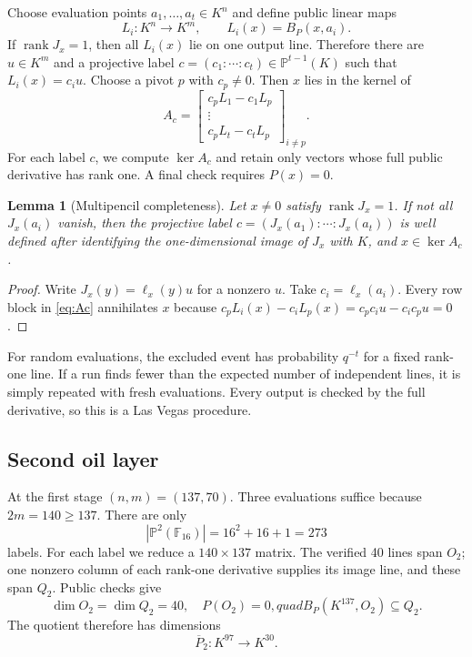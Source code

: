 \documentclass[11pt]{article}
\newtheorem{lemma}[theorem]{Lemma}
\newcommand{\F}{\mathbb{F}}
\newcommand{\Proj}{\mathbb{P}}
\newcommand{\rank}{\operatorname{rank}}
\begin{document}
Choose evaluation points $a_1,\ldots,a_t\in K^n$ and define public linear maps
\[
       L_i:K^n\longrightarrow K^m,\qquad L_i(x)=B_P(x,a_i).
\]
If $\rank J_x=1$, then all $L_i(x)$ lie on one output line.  Therefore there
are $u\in K^m$ and a projective label
$c=(c_1:\cdots:c_t)\in\Proj^{t-1}(K)$ such that $L_i(x)=c_i u$.
Choose a pivot $p$ with $c_p\neq0$.  Then $x$ lies in the kernel of
\begin{equation}
 A_c=\begin{bmatrix}
       c_pL_1-c_1L_p\\[-2pt]
       \vdots\\[-2pt]
       c_pL_t-c_tL_p
     \end{bmatrix}_{i\neq p}.                         \label{eq:Ac}
\end{equation}
For each label $c$, we compute $\ker A_c$ and retain only vectors whose full
public derivative has rank one.  A final check requires $P(x)=0$.

\begin{lemma}[Multipencil completeness]
Let $x\neq0$ satisfy $\rank J_x=1$.  If not all $J_x(a_i)$ vanish, then the
projective label $c=(J_x(a_1):\cdots:J_x(a_t))$ is well defined after
identifying the one-dimensional image of $J_x$ with $K$, and
$x\in\ker A_c$.
\end{lemma}

\begin{proof}
Write $J_x(y)=\ell_x(y)u$ for a nonzero $u$.  Take
$c_i=\ell_x(a_i)$.  Every row block in \eqref{eq:Ac} annihilates $x$ because
$c_pL_i(x)-c_iL_p(x)=c_pc_i u-c_ic_pu=0$.
\end{proof}

For random evaluations, the excluded event has probability $q^{-t}$ for a
fixed rank-one line.  If a run finds fewer than the expected number of
independent lines, it is simply repeated with fresh evaluations.  Every output
is checked by the full derivative, so this is a Las Vegas procedure.

\subsection{Second oil layer}

At the first stage $(n,m)=(137,70)$.  Three evaluations suffice because
$2m=140\geq137$.  There are only
\[
       |\Proj^2(\F_{16})|=16^2+16+1=273
\]
labels.  For each label we reduce a $140\times137$ matrix.  The verified 40
lines span $O_2$; one nonzero column of each rank-one derivative supplies its
image line, and these span $Q_2$.  Public checks give
\[
   \dim O_2=\dim Q_2=40,\quad P(O_2)=0,quad
   B_P(K^{137},O_2)\subseteq Q_2.
\]
The quotient therefore has dimensions
\[
  \overline P_2:K^{97}\longrightarrow K^{30}.
\]
\end{document}
